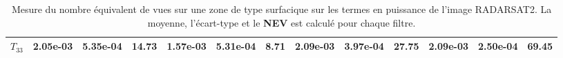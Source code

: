 \begin{table}[!htbp]
\begin{tabular}{c|c|c|c|c|c|c|c|c|c|c|c|c|}
\multicolumn{1}{|c|}{\textbf{$T_{33}$}} & 2.05e-03                      & 5.35e-04                         & \textbf{14.73}                & 1.57e-03                          & 5.31e-04                            & 8.71                             & 2.09e-03                            & 3.97e-04                               & \textbf{27.75}                      & 2.09e-03                         & 2.50e-04                            & \textbf{69.45}                  \\ \hline
\end{tabular}
\caption{\small{Mesure du nombre équivalent de vues sur une zone de type surfacique sur les termes en puissance de l'image RADARSAT2.  La moyenne, l'écart-type et le \textbf{NEV} est calculé pour chaque filtre.}}
\label{tab:radarsat2_results_table}
\end{table}


